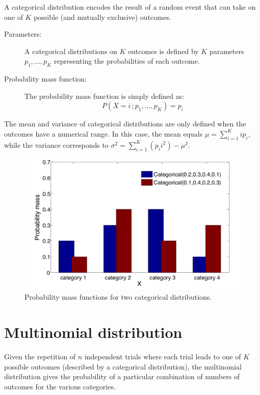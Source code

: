 A categorical distribution encodes the result of a random event that can take on one of $K$ possible (and mutually exclusive) outcomes.

\begin{description}
\item [Parameters: ] A categorical distributions on $K$ outcomes is defined by $K$ parameters $p_1, \dots, p_K$ representing the probabilities of each outcome.

\item [Probability mass function: ] The probability mass function is simply defined as:
\begin{equation}
P(X=i\,; p_1, \dots, p_K) = p_i
\end{equation} 
\end{description}

The mean and variance of categorical distributions are only defined when the outcomes have a numerical range.  In this case, the mean equals $\mu = \sum_{i=1}^{K} i p_i$, while the variance corresponds to $\sigma^2 = \sum_{i=1}^K (p_i i^2) - \mu^2$.

\begin{figure}[h]
\centering
\includegraphics[scale=0.40]{imgs/categorical_appendix.pdf}
\caption{Probability mass functions for two categorical distributions.} 
\label{fig:categorical-appendix}
\end{figure}

\section*{Multinomial distribution}

Given the repetition of $n$ independent trials where each trial leads to one of $K$ possible outcomes (described by a categorical distribution), the multinomial distribution gives the probability of a particular combination of numbers of outcomes for the various categories. 

